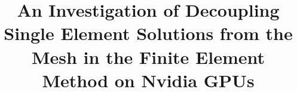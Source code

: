 \documentclass[a4paper, oneside, 11pt]{report}
\title{An Investigation of Decoupling Single Element Solutions from the Mesh in the Finite Element Method on Nvidia GPUs}
\begin{document}









\clearpage



\tableofcontents
\clearpage
{}
\listoffigures
\clearpage
{}
\listoftables
\clearpage
{}


















\clearpage
\renewcommand*{\thesection}{}\textbf{}






\appendix
\renewcommand*{\thesection}{\Alph{section}}\textbf{}

\begin{appendices}

\end{appendices}
\end{document}
